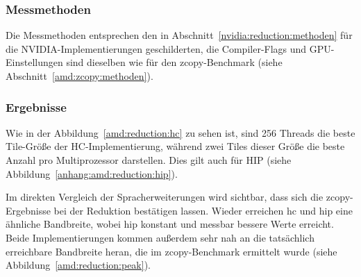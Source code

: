 \subsubsection{Messmethoden}

Die Messmethoden entsprechen den in Abschnitt~\ref{nvidia:reduction:methoden}
für die NVIDIA-Implementierungen geschilderten, die Compiler-Flags und
GPU-Einstellungen sind dieselben wie für den zcopy-Benchmark (siehe
Abschnitt~\ref{amd:zcopy:methoden}).

\subsubsection{Ergebnisse}

Wie in der Abbildung~\ref{amd:reduction:hc} zu sehen ist, sind 256 Threads die
beste Tile-Größe der HC-Implementierung, während zwei Tiles dieser Größe die
beste Anzahl pro Multiprozessor darstellen. Dies gilt auch für HIP (siehe
Abbildung~\ref{anhang:amd:reduction:hip}).

Im direkten Vergleich der Spracherweiterungen wird sichtbar, dass sich die
zcopy-Ergebnisse bei der Reduktion bestätigen lassen. Wieder erreichen \gls{hc}
und \gls{hip} eine ähnliche Bandbreite, wobei \gls{hip} konstant und messbar
bessere Werte erreicht. Beide Implementierungen kommen außerdem sehr nah an die
tatsächlich erreichbare Bandbreite heran, die im zcopy-Benchmark ermittelt wurde
(siehe Abbildung~\ref{amd:reduction:peak}).

